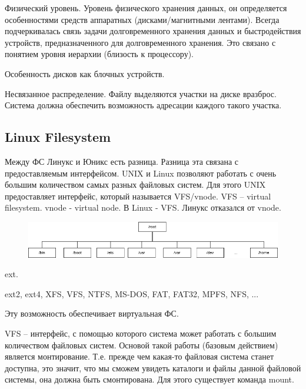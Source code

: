 \documentclass[a4paper,12pt]{article}
\begin{document}
Физический уровень. Уровень физического хранения данных, он определяется особенностями средств аппаратных (дисками/магнитными лентами). Всегда подчеркивалась связь задачи долговременного хранения данных и быстродействия устройств, предназначенного для долговременного хранения. Это связано с понятием уровня иерархии (близость к процессору).

Особенность дисков как блочных устройств.

Несвязанное распределение. Файлу выделяются участки на диске вразброс. Система должна обеспечить возможность адресации каждого такого участка.

\subsection{Linux Filesystem}

Между ФС Линукс и Юникс есть разница. Разница эта связана с предоставляемым интерфейсом. UNIX и Linux позволяют работать с очень большим количеством самых разных файловых систем. Для этого UNIX предоставляет интерфейс, который называется VFS/vnode. VFS -- virtual filesystem. vnode - virtual node. В Linux - VFS. Линукс отказался от vnode.

\begin{figure}[ht]
	\centering
	\includegraphics[width=\linewidth]{hierarchy}
\end{figure}

ext.

ext2, ext4, XFS, VFS, NTFS, MS-DOS, FAT, FAT32, MPFS, NFS, ...

Эту возможность обеспечивает виртуальная ФС.

\clearpage

VFS -- интерфейс, с помощью которого система может работать с большим количеством файловых систем. Основой такой работы (базовым действием) является монтирование. Т.е. прежде чем какая-то файловая система станет доступна, это значит, что мы сможем увидеть каталоги и файлы данной файловой системы, она должна быть смонтирована. Для этого существует команда mount.
\end{document}
